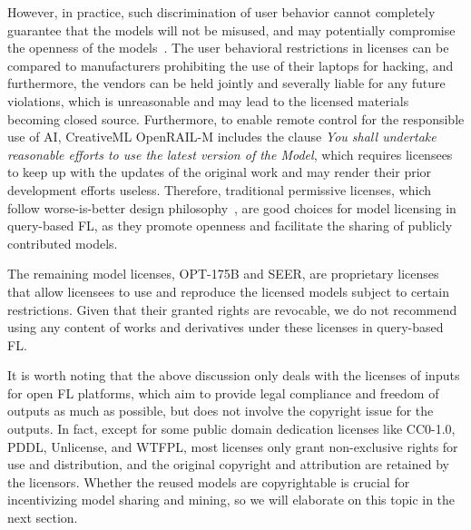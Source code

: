   However, in practice, such discrimination of user behavior cannot completely guarantee that the models will not be misused, and may potentially compromise the openness of the models~\cite{perens1999open, greenbaum2016the}.
  The user behavioral restrictions in licenses can be compared to manufacturers prohibiting the use of their laptops for hacking, and furthermore, the vendors can be held jointly and severally liable for any future violations, which is unreasonable and may lead to the licensed materials becoming closed source. 
  Furthermore, to enable remote control for the responsible use of AI, CreativeML OpenRAIL-M includes the clause \textit{You shall undertake reasonable efforts to use the latest version of the Model}, which requires licensees to keep up with the updates of the original work and may render their prior development efforts useless.
  Therefore, traditional permissive licenses, which follow worse-is-better design philosophy~\cite{gabriel1991rise}, are good choices for model licensing in query-based FL, as they promote openness and facilitate the sharing of publicly contributed models.

  The remaining model licenses, OPT-175B and SEER, are proprietary licenses that allow licensees to use and reproduce the licensed models subject to certain restrictions. 
  Given that their granted rights are revocable, we do not recommend using any content of works and derivatives under these licenses in query-based FL.

It is worth noting that the above discussion only deals with the licenses of inputs for open FL platforms, which aim to provide legal compliance and freedom of outputs as much as possible, but does not involve the copyright issue for the outputs.
In fact, except for some public domain dedication licenses like CC0-1.0, PDDL, Unlicense, and WTFPL, most licenses only grant non-exclusive rights for use and distribution, and the original copyright and attribution are retained by the licensors.
Whether the reused models are copyrightable is crucial for incentivizing model sharing and mining, so we will elaborate on this topic in the next section.

